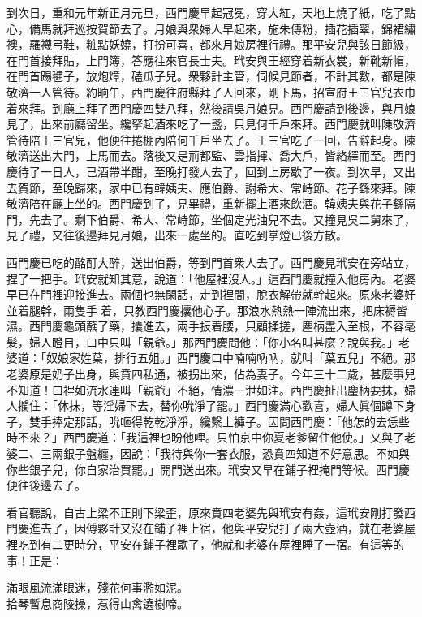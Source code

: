 到次日，重和元年新正月元旦，西門慶早起冠冕，穿大紅，天地上燒了紙，吃了點心，備馬就拜巡按賀節去了。月娘與衆婦人早起來，施朱傅粉，插花插翠，錦裙繡襖，羅襪弓鞋，粧點妖嬈，打扮可喜，都來月娘房裡行禮。那平安兒與該日節級，在門首接拜貼，上門簿，答應往來官長士夫。玳安與王經穿着新衣裳，新靴新帽，在門首踢毽子，放炮𤍤，磕瓜子兒。衆夥計主管，伺候見節者，不計其數，都是陳敬濟一人管待。{}約晌午，西門慶往府縣拜了人回來，剛下馬，招宣府王三官兒衣巾着來拜。到廳上拜了西門慶四雙八拜，然後請吳月娘見。西門慶請到後邊，與月娘見了，出來前廳留坐。纔拏起酒來吃了一盞，只見何千戶來拜。西門慶就叫陳敬濟管待陪王三官兒，他便往捲棚內陪何千戶坐去了。王三官吃了一回，告辭起身。陳敬濟送出大門，上馬而去。落後又是荊都監、雲指揮、喬大戶，皆絡繹而至。西門慶待了一日人，已酒帶半酣，至晚打發人去了，回到上房歇了一夜。到次早，又出去賀節，至晚歸來，家中已有韓姨夫、應伯爵、謝希大、常峙節、花子繇來拜。陳敬濟陪在廳上坐的。西門慶到了，見畢禮，重新擺上酒來飲酒。韓姨夫與花子繇隔門，先去了。剩下伯爵、希大、常峙節，坐個定光油兒不去。{}又撞見吳二舅來了，見了禮，又往後邊拜見月娘，出來一處坐的。直吃到掌燈已後方散。

西門慶已吃的酩酊大醉，送出伯爵，等到門首衆人去了。西門慶見玳安在旁站立，捏了一把手。玳安就知其意，說道：「他屋裡沒人。」這西門慶就撞入他房內。老婆早已在門裡迎接進去。{}兩個也無閑話，走到裡間，脫衣解帶就幹起來。原來老婆好並着腿幹，兩隻手𢵞着，只教西門慶攮他心子。那浪水熱熱一陣流出來，把床褥皆濕。西門慶龜頭蘸了藥，攮進去，兩手扳着腰，只顧揉搓，麈柄盡入至根，不容毫髮，婦人瞪目，口中只叫「親爺。」那西門慶問他：「你小名叫甚麼？說與我。」老婆道：「奴娘家姓葉，排行五姐。」西門慶口中喃喃吶吶，就叫「葉五兒」不絕。那老婆原是奶子出身，與賁四私通，被拐出來，佔為妻子。今年三十二歲，甚麼事兒不知道！口裡如流水連叫「親爺」不絕，情濃一泄如注。西門慶扯出麈柄要抹，婦人攔住：「休抹，等淫婦下去，替你吮淨了罷。」西門慶滿心歡喜，婦人眞個蹲下身子，雙手捧定那話，吮咂得乾乾淨淨，纔繫上褲子。因問西門慶：「他怎的去恁些時不來？」西門慶道：「我這裡也盼他哩。只怕京中你夏老爹留住他使。」又與了老婆二、三兩銀子盤纏，因說：「我待與你一套衣服，恐賁四知道不好意思。不如與你些銀子兒，你自家治買罷。」開門送出來。玳安又早在鋪子裡掩門等候。西門慶便往後邊去了。

看官聽說，自古上梁不正則下梁歪，原來賁四老婆先與玳安有姦，這玳安剛打發西門慶進去了，因傅夥計又沒在鋪子裡上宿，他與平安兒打了兩大壺酒，就在老婆屋裡吃到有二更時分，平安在鋪子裡歇了，他就和老婆在屋裡睡了一宿。有這等的事！正是：

\begin{myquote}
滿眼風流滿眼迷，殘花何事濫如泥。\\拾琴暫息商陵操，惹得山禽遶樹啼。
\end{myquote}

